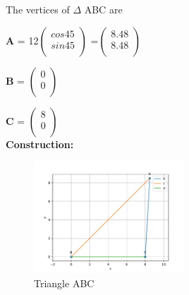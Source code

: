 \documentclass{article}
\begin{document}
  The vertices of $\Delta$ ABC are \\ \vspace{3mm}
     \raggedright \textbf{A} = 12$\begin{pmatrix}
                 cos 45 \\ 
                 sin 45 \\
              \end{pmatrix}$
              =$\begin{pmatrix}
                 8.48 \\
                 8.48 \\
                 \end{pmatrix}$
                 \vspace{5mm}
              \\ \raggedright  \textbf{B} = $\begin{pmatrix}
                 0\\
                 0\\
              \end{pmatrix}$
              \vspace{5mm}
             \\ \raggedright  \textbf{C} = $\begin{pmatrix}
                  8\\
                  0\\
              \end{pmatrix}$
              \\
	      \vspace{5mm}
\textbf{Construction:}\\
\begin{figure}[h]
 \begin{center}
	 \includegraphics[width=0.5\textwidth]{figs/triangle.pdf}
 \end{center}
 \caption{Triangle ABC}
 \label{fig:Fig1}
\end{figure}	
\end{document}
